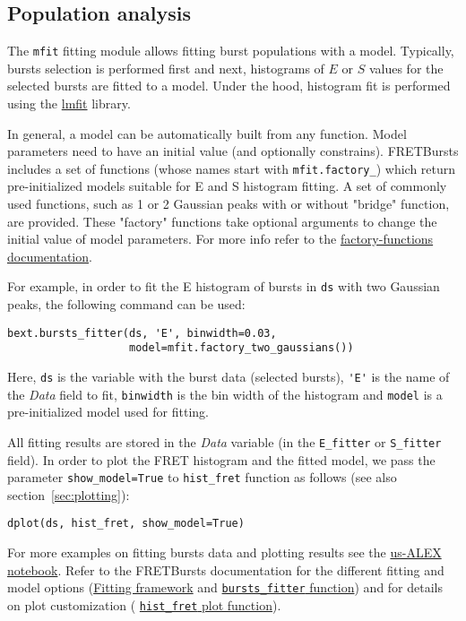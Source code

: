 \subsection{Population analysis}
\label{sec:fretfit}

The \verb|mfit| fitting module allows fitting burst populations with a model.
Typically, bursts selection is performed first and next, histograms of
$E$ or $S$ values for the selected bursts are fitted to a model.
Under the hood, histogram fit is performed using the
\href{http://lmfit.github.io/lmfit-py/}{lmfit} library.

In general, a model can be automatically built from any function.
Model parameters need to have an initial value (and optionally
constrains). FRETBursts includes a set of functions (whose names start with
\verb|mfit.factory_|) which return pre-initialized models suitable for E and S
histogram fitting. A set of commonly used functions, such as 1 or 2 Gaussian
peaks with or without "bridge" function, are provided. These "factory" functions
take optional arguments to change the initial value of model parameters.
For more info refer to the
\href{http://fretbursts.readthedocs.org/en/latest/mfit.html#model-factory-functions}{factory-functions documentation}.

For example, in order to fit the E histogram of bursts in \verb|ds| with two
Gaussian peaks, the following command can be used:

\begin{verbatim}
bext.bursts_fitter(ds, 'E', binwidth=0.03,
                   model=mfit.factory_two_gaussians())
\end{verbatim}

Here, \verb|ds| is the variable with the burst data (selected bursts),
\verb|'E'| is the name of the \textit{Data} field to fit, \verb|binwidth| is the bin
width of the histogram and \verb|model| is a pre-initialized model used for
fitting.

All fitting results are stored in the \textit{Data} variable (in the \verb|E_fitter| or
\verb|S_fitter| field).
In order to plot the FRET histogram and the fitted model, we pass the parameter
\verb|show_model=True| to \verb|hist_fret| function as follows
(see also section~\ref{sec:plotting}):

\begin{verbatim}
dplot(ds, hist_fret, show_model=True)
\end{verbatim}

For more examples on fitting bursts data and plotting results see the
\href{http://nbviewer.ipython.org/urls/raw.github.com/tritemio/FRETBursts_notebooks/master/notebooks/FRETBursts\%2520-\%2520us-ALEX\%2520smFRET\%2520burst\%2520analysis.ipynb}{us-ALEX notebook}.
Refer to the FRETBursts documentation for the different fitting and model options
(\href{http://fretbursts.readthedocs.org/en/latest/fit.html}{Fitting framework} and
\href{http://fretbursts.readthedocs.org/en/latest/plugins.html#fretbursts.burstlib\_ext.bursts\_fitter}{\texttt{bursts\_fitter} function})
and for details on plot customization (
\href{http://fretbursts.readthedocs.org/en/latest/plots.html#fretbursts.burst_plot.hist_fret}{\texttt{hist\_fret} plot function}).


